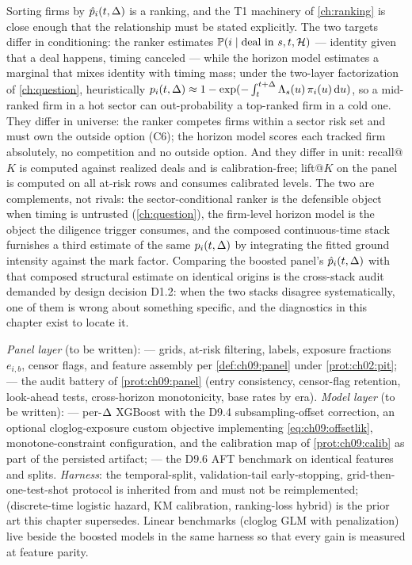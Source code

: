Sorting firms by $\hat p_i(t, \Delta)$ is a ranking, and the T1
machinery of \cref{ch:ranking} is close enough that the relationship
must be stated explicitly. The two targets differ in
conditioning: the ranker estimates $\mathbb{P}(i \mid \text{deal in } s, t,
\mathcal{H})$ --- identity given that a deal happens, timing canceled ---
while the horizon model estimates a marginal that mixes identity with
timing mass; under the two-layer factorization of
\cref{ch:question}, heuristically $p_i(t,\Delta) \approx 1 -
\exp(-\int_t^{t+\Delta} \Lambda_s(u)\, \pi_i(u) \,\mathrm{d} u)$, so a
mid-ranked firm in a hot sector can out-probability a top-ranked firm
in a cold one. They differ in universe: the ranker competes firms
within a sector risk set and must own the outside option (C6); the
horizon model scores each tracked firm absolutely, no competition and
no outside option. And they differ in unit: recall@$K$ is computed
against realized deals and is calibration-free; lift@$K$ on the panel
is computed on all at-risk rows and consumes calibrated levels. The two
are complements, not rivals: the sector-conditional ranker is the
defensible object when timing is untrusted (\cref{ch:question}), the
firm-level horizon model is the object the diligence trigger consumes,
and the composed continuous-time stack furnishes a third estimate of
the same $p_i(t,\Delta)$ by integrating the fitted ground intensity
against the mark factor. Comparing the boosted panel's
$\hat p_i(t,\Delta)$ with that composed structural estimate on
identical origins is the cross-stack audit demanded by design decision
D1.2: when the two stacks disagree systematically, one of them is wrong
about something specific, and the diagnostics in this chapter exist to
locate it.

\begin{codehooks}
\emph{Panel layer} (to be written):  ---
grids, at-risk filtering, labels, exposure fractions $e_{i,b}$, censor
flags, and feature assembly per \cref{def:ch09:panel} under
\cref{prot:ch02:pit};  --- the audit battery of
\cref{prot:ch09:panel} (entry consistency, censor-flag retention,
look-ahead tests, cross-horizon monotonicity, base rates by era).
\emph{Model layer} (to be written):  ---
per-$\Delta$ XGBoost with the D9.4 subsampling-offset correction, an
optional cloglog-exposure custom objective implementing
\cref{eq:ch09:offsetlik}, monotone-constraint configuration, and the
calibration map of \cref{prot:ch09:calib} as part of the persisted
artifact;  --- the D9.6 AFT benchmark on
identical features and splits. \emph{Harness}: the temporal-split,
validation-tail early-stopping, grid-then-one-test-shot protocol is
inherited from  and must not
be reimplemented;  (discrete-time
logistic hazard, KM calibration, ranking-loss hybrid) is the prior art
this chapter supersedes. Linear benchmarks (cloglog GLM with
\citet{firth1993} penalization) live beside the boosted models in the
same harness so that every gain is measured at feature parity.
\end{codehooks}
